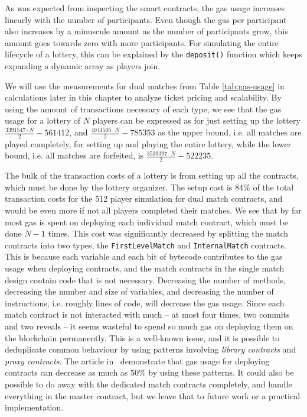 As was expected from inspecting the smart contracts, the gas usage increases linearly with the number of participants. Even though the gas per participant also increases by a minuscule amount as the number of participants grow, this amount goes towards zero with more participants. For simulating the entire lifecycle of a lottery, this can be explained by the \texttt{deposit()} function which keeps expanding a dynamic array as players join. 

We will use the measurements for dual matches from Table \ref{tab:gas-usage} in calculations later in this chapter to analyze ticket pricing and scalability. By using the amount of transactions necessary of each type, we see that the gas usage for a lottery of $N$ players can be expressed as for just setting up the lottery $\frac{3391547 \cdot N}{2} - 561412$, and $\frac{4041505 \cdot N}{2} - 785353$ as the upper bound, i.e. all matches are played completely, for setting up and playing the entire lottery, while the lower bound, i.e. all matches are forfeited, is $\frac{3539397 \cdot N}{2} - 522235$.

The bulk of the transaction costs of a lottery is from setting up all the contracts, which must be done by the lottery organizer. The setup cost is 84\% of the total transaction costs for the 512 player simulation for dual match contracts, and would be even more if not all players completed their matches. We see that by far most gas is spent on deploying each individual match contract, which must be done $N-1$ times. This cost was significantly decreased by splitting the match contracts into two types, the \texttt{FirstLevelMatch} and \texttt{InternalMatch} contracts. This is because each variable and each bit of bytecode contributes to the gas usage when deploying contracts, and the match contracts in the single match design contain code that is not necessary. Decreasing the number of methods, decreasing the number and size of variables, and decreasing the number of instructions, i.e. roughly lines of code, will decrease the gas usage. Since each match contract is not interacted with much – at most four times, two commits and two reveals – it seems wasteful to spend so much gas on deploying them on the blockchain permanently. This is a well-known issue, and it is possible to deduplicate common behaviour by using patterns involving \emph{library contracts} and \emph{proxy contracts}. The article in~\cite{lu_solidity_2018} demonstrate that gas usage for deploying contracts can decrease as much as 50\% by using these patterns. It could also be possible to do away with the dedicated match contracts completely, and handle everything in the master contract, but we leave that to future work or a practical implementation.


